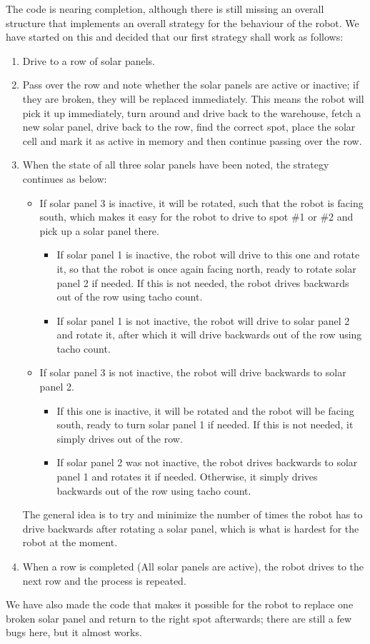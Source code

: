 The code is nearing completion, although there is still missing an
overall structure that implements an overall strategy for the behaviour
of the robot. We have started on this and decided that our first
strategy shall work as follows:
\begin{enumerate}
\item Drive to a row of solar
panels.
\item Pass over the row and note whether the solar panels
are active or inactive; if they are broken, they will be replaced
immediately. This means the robot will pick it up immediately, turn
around and drive back to the warehouse, fetch a new solar panel, drive
back to the row, find the correct spot, place the solar cell and mark it
as active in memory and then continue passing over the row.
\item
When the state of all three solar panels have been noted, the strategy
continues as below:
\begin{itemize} 
\item If solar panel 3 is inactive, it will be rotated,
such that the robot is facing south, which makes it easy for the robot
to drive to spot \#1 or \#2 and pick up a solar panel there.
\begin{itemize} 
\item If solar
panel 1 is inactive, the robot will drive to this one and rotate it, so
that the robot is once again facing north, ready to rotate solar panel 2
if needed. If this is not needed, the robot drives backwards out of the row
using tacho count.
\item If solar panel 1 is not inactive, the robot will drive to solar panel 2 and rotate it, after which it will drive backwards out of the row using tacho count.
\end{itemize}
\item If solar panel 3 is not inactive, the robot will drive
backwards to solar panel 2.
\begin{itemize} 
\item If this one is inactive, it will be rotated
and the robot will be facing south, ready to turn solar panel 1 if
needed. If this is not needed, it simply drives out of the row. 
\item If solar panel 2 was not inactive, the robot drives backwards to solar panel 1 and rotates it if needed. Otherwise, it simply drives backwards out of the row using tacho count.
\end{itemize}
\end{itemize}
The general idea is to try and minimize the number of times the robot
has to drive backwards after rotating a solar panel, which is what is
hardest for the robot at the moment.
\item When a row is completed (All solar panels are active), the
robot drives to the next row and the process is repeated.
\end{enumerate}
We have also made the code that makes it possible for the robot to
replace one broken solar panel and return to the right spot afterwards;
there are still a few bugs here, but it almost works.
